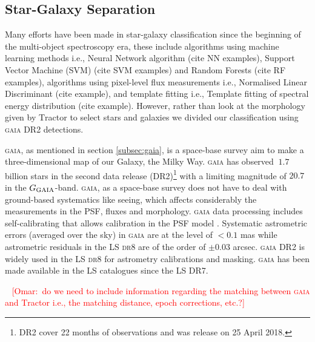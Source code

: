 \documentclass[fleqn,usenatbib]{mnras}
\newcommand{\omar}[1]{~\newline\noindent \textcolor{red}{{ [Omar:~{#1}]\\}}}
\newcommand{\DReight}{\textsc{dr8}\xspace}
\newcommand{\GAIA}{\textsc{gaia}\xspace}
\newcommand{\TRACTOR}{\textsc{T}ractor\xspace}
\begin{document}
\subsection{Star-Galaxy Separation}\label{subsec:star_galaxy}

Many efforts have been made in star-galaxy classification since the beginning of the multi-object spectroscopy era, these include algorithms using machine learning methods i.e., Neural Network algorithm (cite NN examples), Support Vector Machine (SVM) (cite SVM examples) and Random Forests (cite RF examples), algorithms using pixel-level flux measurements i.e., Normalised Linear Discriminant (cite example), and template fitting i.e., Template fitting of spectral energy distribution (cite example). However, rather than look at the morphology given by \TRACTOR to select stars and galaxies we divided our classification using \GAIA DR2 detections. 

\GAIA \citep{2016A&A...595A...1G}, as mentioned in section \ref{subsec:gaia}, is a space-base survey aim to make a three-dimensional map of our Galaxy, the Milky Way. \GAIA has observed $~1.7$ billion stars in the second data release (DR2)\footnote{DR2 cover 22 months of observations and was release on 25 April 2018.} with a limiting magnitude of $20.7$ in the $G_{\rm{GAIA}}$-band. \GAIA, as a space-base survey does not have to deal with ground-based systematics like seeing, which affects considerably the measurements in the PSF, fluxes and morphology. \GAIA data processing includes self-calibrating that allows calibration in the PSF model \citep{2016A&A...595A...1G}. Systematic astrometric errors (averaged over the sky) in \GAIA are at the level of $<0.1$ mas while astrometric residuals in the LS \DReight are of the order of $\pm 0.03$ arcsec. \GAIA DR2 is widely used in the LS \DReight for astrometry calibrations and masking. \GAIA has been made available in the LS catalogues since the LS DR7.

\omar{do we need to include information regarding the matching between \GAIA and \TRACTOR i.e., the matching distance, epoch corrections, etc.?}
\end{document}
